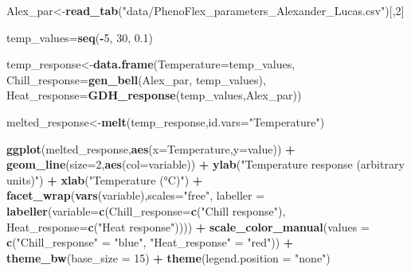 \documentclass[
]{book}
\newenvironment{Shaded}{\begin{snugshade}}{\end{snugshade}}
\newcommand{\DataTypeTok}[1]{\textcolor[rgb]{0.13,0.29,0.53}{#1}}
\newcommand{\DecValTok}[1]{\textcolor[rgb]{0.00,0.00,0.81}{#1}}
\newcommand{\FloatTok}[1]{\textcolor[rgb]{0.00,0.00,0.81}{#1}}
\newcommand{\KeywordTok}[1]{\textcolor[rgb]{0.13,0.29,0.53}{\textbf{#1}}}
\newcommand{\NormalTok}[1]{#1}
\newcommand{\OperatorTok}[1]{\textcolor[rgb]{0.81,0.36,0.00}{\textbf{#1}}}
\newcommand{\StringTok}[1]{\textcolor[rgb]{0.31,0.60,0.02}{#1}}
\begin{document}
\begin{Shaded}
\begin{Highlighting}[]
\NormalTok{Alex_par<-}\KeywordTok{read_tab}\NormalTok{(}\StringTok{"data/PhenoFlex_parameters_Alexander_Lucas.csv"}\NormalTok{)[,}\DecValTok{2}\NormalTok{]}

\NormalTok{temp_values=}\KeywordTok{seq}\NormalTok{(}\OperatorTok{-}\DecValTok{5}\NormalTok{, }\DecValTok{30}\NormalTok{, }\FloatTok{0.1}\NormalTok{)}

\NormalTok{temp_response<-}\KeywordTok{data.frame}\NormalTok{(}\DataTypeTok{Temperature=}\NormalTok{temp_values,}
                          \DataTypeTok{Chill_response=}\KeywordTok{gen_bell}\NormalTok{(Alex_par, temp_values),}
                          \DataTypeTok{Heat_response=}\KeywordTok{GDH_response}\NormalTok{(temp_values,Alex_par))}

\NormalTok{melted_response<-}\KeywordTok{melt}\NormalTok{(temp_response,}\DataTypeTok{id.vars=}\StringTok{"Temperature"}\NormalTok{)}

\KeywordTok{ggplot}\NormalTok{(melted_response,}\KeywordTok{aes}\NormalTok{(}\DataTypeTok{x=}\NormalTok{Temperature,}\DataTypeTok{y=}\NormalTok{value)) }\OperatorTok{+}
\StringTok{  }\KeywordTok{geom_line}\NormalTok{(}\DataTypeTok{size=}\DecValTok{2}\NormalTok{,}\KeywordTok{aes}\NormalTok{(}\DataTypeTok{col=}\NormalTok{variable)) }\OperatorTok{+}
\StringTok{  }\KeywordTok{ylab}\NormalTok{(}\StringTok{"Temperature response (arbitrary units)"}\NormalTok{) }\OperatorTok{+}
\StringTok{  }\KeywordTok{xlab}\NormalTok{(}\StringTok{"Temperature (°C)"}\NormalTok{) }\OperatorTok{+}
\StringTok{  }\KeywordTok{facet_wrap}\NormalTok{(}\KeywordTok{vars}\NormalTok{(variable),}\DataTypeTok{scales=}\StringTok{"free"}\NormalTok{,}
             \DataTypeTok{labeller =} \KeywordTok{labeller}\NormalTok{(}\DataTypeTok{variable=}\KeywordTok{c}\NormalTok{(}\DataTypeTok{Chill_response=}\KeywordTok{c}\NormalTok{(}\StringTok{"Chill response"}\NormalTok{),}
                                 \DataTypeTok{Heat_response=}\KeywordTok{c}\NormalTok{(}\StringTok{"Heat response"}\NormalTok{)))) }\OperatorTok{+}
\StringTok{  }\KeywordTok{scale_color_manual}\NormalTok{(}\DataTypeTok{values =} \KeywordTok{c}\NormalTok{(}\StringTok{"Chill_response"}\NormalTok{ =}\StringTok{ "blue"}\NormalTok{, }\StringTok{"Heat_response"}\NormalTok{ =}\StringTok{ "red"}\NormalTok{)) }\OperatorTok{+}
\StringTok{  }\KeywordTok{theme_bw}\NormalTok{(}\DataTypeTok{base_size =} \DecValTok{15}\NormalTok{) }\OperatorTok{+}
\StringTok{  }\KeywordTok{theme}\NormalTok{(}\DataTypeTok{legend.position =} \StringTok{"none"}\NormalTok{)}
\end{Highlighting}
\end{Shaded}
\end{document}
